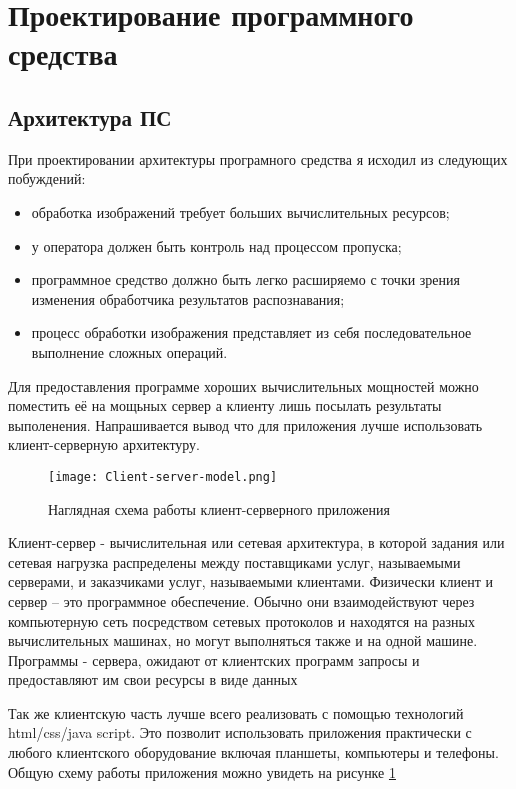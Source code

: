 \section{Проектирование программного средства}
\label{sec:arch}

\subsection{Архитектура ПС}
\label{sec:arch_arch}

При проектировании архитектуры програмного средства я исходил из следующих побуждений:
\begin{itemize}
	\item обработка изображений требует больших вычислительных ресурсов;
	\item у оператора должен быть контроль над процессом пропуска;
	\item программное средство должно быть легко расширяемо с точки зрения изменения обработчика результатов распознавания;
	\item процесс обработки изображения представляет из себя последовательное выполнение сложных операций.
\end{itemize}

Для предоставления программе хороших вычислительных мощностей можно поместить её на мощьных сервер а клиенту лишь посылать результаты выполенения. Напрашивается вывод что для приложения лучше использовать клиент-серверную архитектуру. 

\begin{figure}[ht] 
    \centering
    \texttt{[image: Client-server-model.png]}  
    \caption{Наглядная схема работы клиент-серверного приложения}
    \label{fig:arch_arch:client_server}
\end{figure}

Клиент-сервер - вычислительная или сетевая архитектура, в которой задания или сетевая нагрузка распределены между поставщиками услуг, называемыми серверами, и заказчиками услуг, называемыми клиентами. Физически клиент и сервер -- это программное обеспечение. Обычно они взаимодействуют через компьютерную сеть посредством сетевых протоколов и находятся на разных вычислительных машинах, но могут выполняться также и на одной машине. Программы - сервера, ожидают от клиентских программ запросы и предоставляют им свои ресурсы в виде данных

Так же клиентскую часть лучше всего реализовать с помощью технологий html/css/java script. Это позволит использовать приложения практически с любого клиентского оборудование включая планшеты, компьютеры и телефоны. Общую схему работы приложения можно увидеть на рисунке \ref{fig:arch_arch:client_server}

